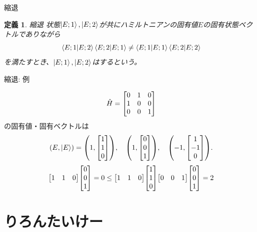 \documentclass[dvipdfm]{beamer}
\newtheorem*{defn}{定義}
\begin{document}
\begin{frame}{縮退}
    \begin{defn}{縮退}
        状態$\ket{E;1},\ket{E;2}$が共にハミルトニアンの固有値$E$の固有状態ベクトルでありながら
        \begin{equation*}
            \braket{E;1}{E;2}\braket{E;2}{E;1}
            \neq
            \braket{E;1}{E;1}\braket{E;2}{E;2}
        \end{equation*}
        を満たすとき、$\ket{E;1}, \ket{E;2}$はするという。
    \end{defn}
\end{frame}

\begin{frame}{縮退: 例}
    \begin{example}
        \begin{equation*}
            \hat{H}
            =
            \mqty[0 & 1 & 0 \\ 1 & 0 & 0 \\ 0 & 0 & 1]
        \end{equation*}
        の固有値・固有ベクトルは
        \begin{equation*}
            \qty(E,\ket{E})
            =
            \qty(1,\mqty[1 \\ 1 \\ 0]),
            \quad
            \qty(1,\mqty[0 \\ 0 \\ 1]),
            \quad
            \qty(-1,\mqty[1 \\ -1 \\ 0]).
        \end{equation*}
        \begin{equation*}
            \mqty[1 & 1 & 0]\mqty[0 \\ 0 \\ 1]
            =0
            \leq
            \mqty[1 & 1 & 0]\mqty[1 \\ 1 \\ 0]
            \mqty[0 & 0 & 1]\mqty[0 \\ 0 \\ 1]
            =2
        \end{equation*}
    \end{example}
\end{frame}


\section{りろんたいけー}
\end{document}
